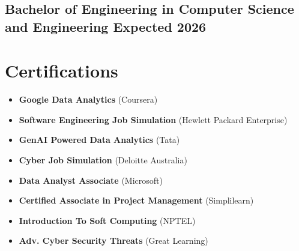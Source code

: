 \subsection{{Bachelor of Engineering in Computer Science and Engineering} \hfill Expected 2026}
\vspace{8pt}

\section{Certifications}
\begin{itemize}
\item \textbf{Google Data Analytics} (Coursera)
\item \textbf{Software Engineering Job Simulation} (Hewlett Packard Enterprise)
\item \textbf{GenAI Powered Data Analytics} (Tata)
\item \textbf{Cyber Job Simulation} (Deloitte Australia)
\item \textbf{Data Analyst Associate} (Microsoft)
\item \textbf{Certified Associate in Project Management} (Simplilearn)
\item \textbf{Introduction To Soft Computing} (NPTEL)
\item \textbf{Adv. Cyber Security Threats} (Great Learning)
\end{itemize}
